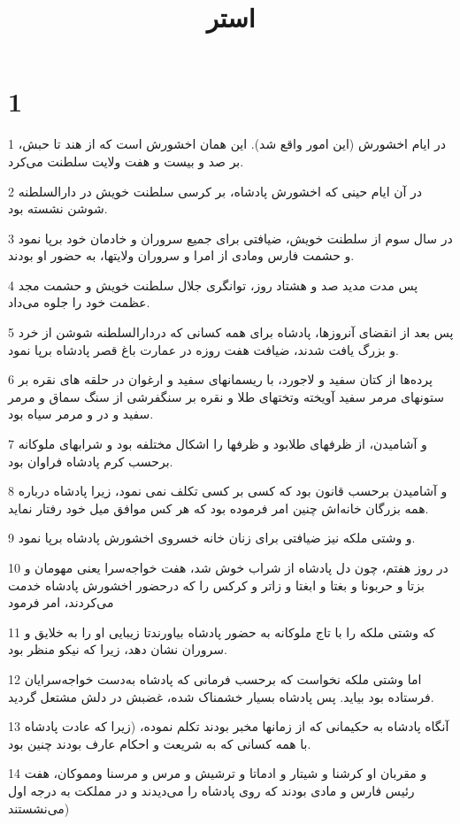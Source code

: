 

\title{استر}

 
\chapter{1}

\par 1 در ایام اخشورش (این امور واقع شد). این همان اخشورش است که از هند تا حبش، بر صد و بیست و هفت ولایت سلطنت می‌کرد.
\par 2 در آن ایام حینی که اخشورش پادشاه، بر کرسی سلطنت خویش در دارالسلطنه شوشن نشسته بود.
\par 3 در سال سوم از سلطنت خویش، ضیافتی برای جمیع سروران و خادمان خود برپا نمود و حشمت فارس ومادی از امرا و سروران ولایتها، به حضور او بودند.
\par 4 پس مدت مدید صد و هشتاد روز، توانگری جلال سلطنت خویش و حشمت مجد عظمت خود را جلوه می‌داد.
\par 5 پس بعد از انقضای آنروزها، پادشاه برای همه کسانی که دردارالسلطنه شوشن از خرد و بزرگ یافت شدند، ضیافت هفت روزه در عمارت باغ قصر پادشاه برپا نمود.
\par 6 پرده‌ها از کتان سفید و لاجورد، با ریسمانهای سفید و ارغوان در حلقه های نقره بر ستونهای مرمر سفید آویخته وتختهای طلا و نقره بر سنگفرشی از سنگ سماق و مرمر سفید و در و مرمر سیاه بود.
\par 7 و آشامیدن، از ظرفهای طلابود و ظرفها را اشکال مختلفه بود و شرابهای ملوکانه برحسب کرم پادشاه فراوان بود.
\par 8 و آشامیدن برحسب قانون بود که کسی بر کسی تکلف نمی نمود، زیرا پادشاه درباره همه بزرگان خانه‌اش چنین امر فرموده بود که هر کس موافق میل خود رفتار نماید.
\par 9 و وشتی ملکه نیز ضیافتی برای زنان خانه خسروی اخشورش پادشاه برپا نمود.
\par 10 در روز هفتم، چون دل پادشاه از شراب خوش شد، هفت خواجه‌سرا یعنی مهومان و بزتا و حربونا و بغتا و ابغتا و زاتر و کرکس را که درحضور اخشورش پادشاه خدمت می‌کردند، امر فرمود
\par 11 که وشتی ملکه را با تاج ملوکانه به حضور پادشاه بیاورندتا زیبایی او را به خلایق و سروران نشان دهد، زیرا که نیکو منظر بود.
\par 12 اما وشتی ملکه نخواست که برحسب فرمانی که پادشاه به‌دست خواجه‌سرایان فرستاده بود بیاید. پس پادشاه بسیار خشمناک شده، غضبش در دلش مشتعل گردید.
\par 13 آنگاه پادشاه به حکیمانی که از زمانها مخبر بودند تکلم نموده، (زیرا که عادت پادشاه با همه کسانی که به شریعت و احکام عارف بودند چنین بود.
\par 14 و مقربان او کرشنا و شیتار و ادماتا و ترشیش و مرس و مرسنا ومموکان، هفت رئیس فارس و مادی بودند که روی پادشاه را می‌دیدند و در مملکت به درجه اول می‌نشستند)
